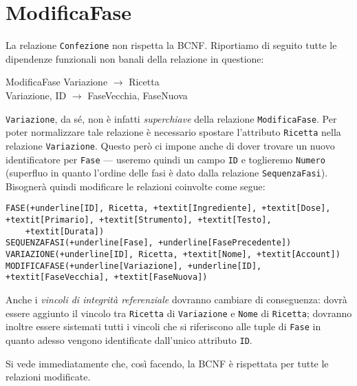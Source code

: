 \section{ModificaFase}\label{sec:modificafase}
La relazione {\tt Confezione} non rispetta la BCNF. Riportiamo di seguito tutte
le dipendenze funzionali non banali della relazione in questione:
\begin{funcdep}{ModificaFase}
    Variazione $\to$ Ricetta\\
    Variazione, ID $\to$ FaseVecchia, FaseNuova
\end{funcdep}
\noindent\texttt{Variazione}, da sé, non è infatti {\it superchiave} della relazione {\tt ModificaFase}.
Per poter normalizzare tale relazione è necessario spostare l'attributo {\tt Ricetta} nella
relazione {\tt Variazione}. Questo però ci impone anche di dover trovare un nuovo identificatore
per {\tt Fase} --- useremo quindi un campo {\tt ID} e toglieremo {\tt Numero} (superfluo in quanto l'ordine
delle fasi è dato dalla relazione {\tt SequenzaFasi}). Bisognerà quindi modificare le
relazioni coinvolte come segue:

\begin{Verbatim}[commandchars=+\[\]]
FASE(+underline[ID], Ricetta, +textit[Ingrediente], +textit[Dose], +textit[Primario], +textit[Strumento], +textit[Testo],
    +textit[Durata])
SEQUENZAFASI(+underline[Fase], +underline[FasePrecedente])
VARIAZIONE(+underline[ID], Ricetta, +textit[Nome], +textit[Account])
MODIFICAFASE(+underline[Variazione], +underline[ID], +textit[FaseVecchia], +textit[FaseNuova])
\end{Verbatim}
Anche i {\it vincoli di integrità referenziale} dovranno cambiare di conseguenza: dovrà
essere aggiunto il vincolo tra {\tt Ricetta} di {\tt Variazione} e {\tt Nome} di {\tt Ricetta}; dovranno
inoltre essere sistemati tutti i vincoli che si riferiscono alle tuple di {\tt Fase} in quanto
adesso vengono identificate dall'unico attributo {\tt ID}.

\vspace{10pt}
\noindent Si vede immediatamente che, così facendo, la BCNF è rispettata per tutte le relazioni modificate.
